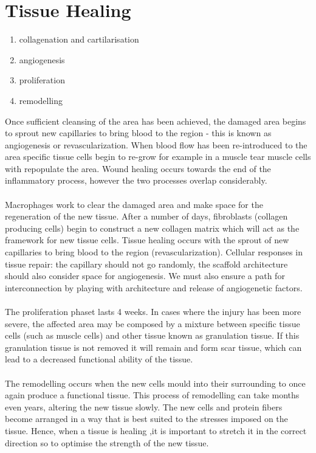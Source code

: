 \section{Tissue Healing}
\begin{enumerate}
\item collagenation and cartilarisation
\item angiogenesis
\item proliferation
\item remodelling
\end{enumerate}
\noindent
Once sufficient cleansing of the area has been achieved, the damaged area begins to sprout new capillaries to bring blood to the region - this is known as angiogenesis or revascularization. 
When blood flow has been re-introduced to the area specific tissue cells begin to re-grow for example in a muscle tear muscle cells with repopulate the area. 
Wound healing occurs towards the end of the inflammatory process, however the two processes overlap considerably. 
\\
\\
\noindent
Macrophages work to clear the damaged area and make space for the regeneration of the new tissue. 
After a number of days, fibroblasts (collagen producing cells) begin to construct a new collagen matrix which will act as the framework for new tissue cells.
Tissue healing occurs with the sprout of new capillaries to bring blood to the region (revascularization). 
Cellular responses in tissue repair: the capillary should not go randomly, the scaffold architecture should also consider space for angiogenesis.
 We must also ensure a path for interconnection by playing with architecture and release of angiogenetic factors.
\\
\\
\noindent
The proliferation phaset lasts 4 weeks. 
In cases where the injury has been more severe, the affected area may be composed by a mixture between specific tissue cells (such as muscle cells) and other tissue known as granulation tissue. 
If this granulation tissue is not removed it will remain and form scar tissue, which can lead to a decreased functional ability of the tissue.
\\
\\
\noindent
The remodelling occurs when the new cells mould into their surrounding to once again produce a functional tissue. 
This process of remodelling can take months even years, altering the new tissue slowly. 
The new cells and protein fibers become arranged in a way that is best suited to the stresses imposed on the tissue. 
Hence, when a tissue is healing ,it is important to stretch it in the correct direction so to optimise the strength of the new tissue.

